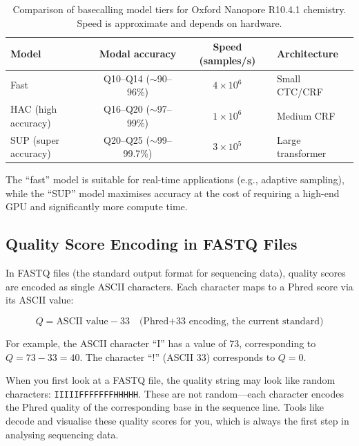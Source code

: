 \begin{table}[htbp]
\centering
\caption[Basecaller model comparison.]{Comparison of  basecalling model tiers for Oxford Nanopore R10.4.1 chemistry. Speed is approximate and depends on hardware.}
\label{tab:seqprinciples:basecaller-models}
\small
\begin{tabular}{lccl}
\toprule
\textbf{Model} & \textbf{Modal accuracy} & \textbf{Speed (samples/s)} & \textbf{Architecture} \\
\midrule
Fast & Q10--Q14 ($\sim$90--96\%) & $4 \times 10^6$ & Small CTC/CRF \\
HAC (high accuracy) & Q16--Q20 ($\sim$97--99\%) & $1 \times 10^6$ & Medium CRF \\
SUP (super accuracy) & Q20--Q25 ($\sim$99--99.7\%) & $3 \times 10^5$ & Large transformer \\
\bottomrule
\end{tabular}
\end{table}

The ``fast'' model is suitable for real-time applications (e.g., adaptive sampling), while the ``SUP'' model maximises accuracy at the cost of requiring a high-end GPU and significantly more compute time.


\subsection{Quality Score Encoding in FASTQ Files}
\label{subsec:seqprinciples:fastq-quality}

In \acrshort{FASTQ} files (the standard output format for sequencing data), quality scores are encoded as single ASCII characters. Each character maps to a Phred score via its ASCII value:

\[
Q = \text{ASCII value} - 33 \quad \text{(Phred+33 encoding, the current standard)}
\]

For example, the ASCII character ``I'' has a value of 73, corresponding to $Q = 73 - 33 = 40$. The character ``!'' (ASCII 33) corresponds to $Q = 0$.

\begin{tipbox}
When you first look at a FASTQ file, the quality string may look like random characters: \texttt{IIIIIFFFFFFFHHHHH}. These are not random---each character encodes the Phred quality of the corresponding base in the sequence line. Tools like  decode and visualise these quality scores for you, which is always the first step in analysing sequencing data.
\end{tipbox}


